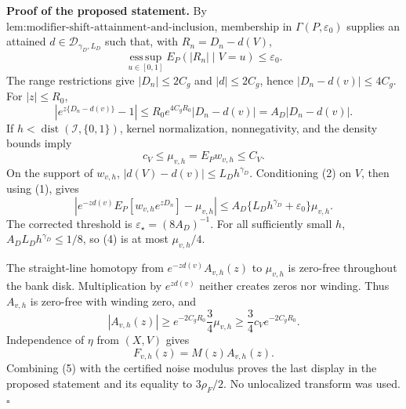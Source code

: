 \textbf{Proof of the proposed statement.}
By \(\text{lem:modifier-shift-attainment-and-inclusion}\), membership in \(\Gamma(P,\varepsilon_0)\) supplies an attained \(d\in\mathcal D_{\gamma_D,L_D}\) such that, with \(R_n=D_n-d(V)\),
\[
 \operatorname*{ess\,sup}_{u\in[0,1]}E_P(|R_n|\mid V=u)\le\varepsilon_0. \tag{1}
\]
The range restrictions give \(|D_n|\le2C_g\) and \(|d|\le2C_g\), hence \(|D_n-d(v)|\le4C_g\).  For \(|z|\le R_0\),
\[
 |e^{z\{D_n-d(v)\}}-1|
 \le R_0e^{4C_gR_0}|D_n-d(v)|=A_D|D_n-d(v)|. \tag{2}
\]
If \(h<\operatorname{dist}(\mathcal I,\{0,1\})\), kernel normalization, nonnegativity, and the density bounds imply
\[
 c_V\le\mu_{v,h}=E_Pw_{v,h}\le C_V. \tag{3}
\]
On the support of \(w_{v,h}\), \(|d(V)-d(v)|\le L_Dh^{\gamma_D}\).  Conditioning (2) on \(V\), then using (1), gives
\[
 \left|e^{-zd(v)}E_P[w_{v,h}e^{zD_n}]-\mu_{v,h}\right|
 \le A_D\{L_Dh^{\gamma_D}+\varepsilon_0\}\mu_{v,h}. \tag{4}
\]
The corrected threshold is \(\varepsilon_\star=(8A_D)^{-1}\).  For all sufficiently small \(h\), \(A_DL_Dh^{\gamma_D}\le1/8\), so (4) is at most \(\mu_{v,h}/4\).

The straight-line homotopy from \(e^{-zd(v)}A_{v,h}(z)\) to \(\mu_{v,h}\) is zero-free throughout the bank disk.  Multiplication by \(e^{zd(v)}\) neither creates zeros nor winding.  Thus \(A_{v,h}\) is zero-free with winding zero, and
\[
 |A_{v,h}(z)|\ge e^{-2C_gR_0}\frac34\mu_{v,h}
 \ge\frac34c_Ve^{-2C_gR_0}. \tag{5}
\]
Independence of \(\eta\) from \((X,V)\) gives
\[
 F_{v,h}(z)=M(z)A_{v,h}(z). \tag{6}
\]
Combining (5) with the certified noise modulus proves the last display in the proposed statement and its equality to \(3\rho_F/2\).  No unlocalized transform was used. \(\square\)